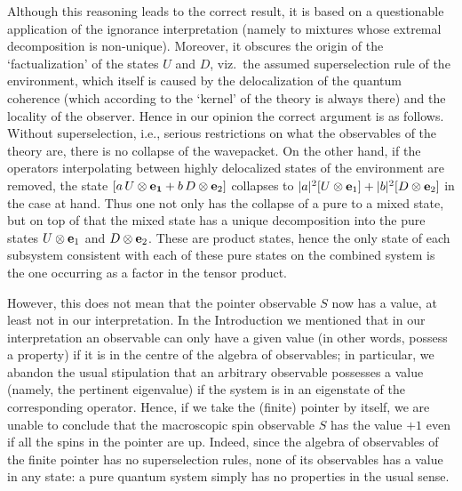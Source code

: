 Although this reasoning leads to the correct result, it is based on a
questionable application of
the ignorance interpretation (namely to mixtures whose extremal decomposition
is non-unique).
 Moreover,
it obscures the origin of the `factualization' of the states $U$ and $D$, viz.\
the assumed
superselection rule of the environment, which itself is caused by the
delocalization of the quantum
coherence (which according to the `kernel' of the theory is always there) and
the locality of the
observer.  Hence in our opinion the correct argument is as follows. Without
superselection,
i.e., serious restrictions on what the observables of the theory are, there is
no collapse of the
wavepacket.    On the other hand, if the operators interpolating
between highly delocalized states of the environment are removed,
the state $[a\, U\otimes {\bf e_1}+ b\, D\otimes {\bf e}_2]$ collapses to
$|a|^2 [U\otimes {\bf e}_1]+|b|^2 [D\otimes {\bf e}_2]$ in the case at hand. Thus one
not only has
the collapse of a pure to a mixed state, but on top of that the mixed state has
a unique decomposition
into the pure states $U\otimes {\bf e}_1$ and $D\otimes {\bf e}_2$. These are product
states, hence the only
state of each subsystem consistent with each of these pure states on the
combined system is the one
occurring as a factor in the tensor product.

However, this does not mean that the pointer observable $S$ now has a value, at
least not in our
interpretation. In the Introduction we mentioned that in our interpretation an
observable can only
have a given value (in other words, possess a property) if it is in the centre
of the algebra of
observables; in particular, we abandon the usual stipulation that an arbitrary
observable possesses a
value (namely, the pertinent eigenvalue) if the system is in an eigenstate of
the corresponding
operator. Hence, if we take the (finite) pointer by  itself, we are unable to
conclude that the
macroscopic spin observable $S$ has the value $+1$ even if all the spins in the
pointer are up.
Indeed, since the algebra of observables of the  finite pointer has no
superselection rules, none of
its observables has a value in any state: a pure quantum system simply has no
properties in the usual
sense.

